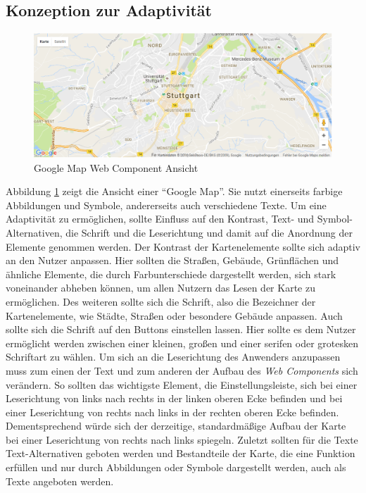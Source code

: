 \documentclass[12pt, paper=a4, bibtotoc, toc=listof, headsepline=true, numbers=endperiod]{scrreprt}
\begin{document}
	\subsection{Konzeption zur Adaptivität}
	\label{ref:konVonAda}
	\begin{figure}			\centering
		\includegraphics[width=\textwidth,height=\textheight,keepaspectratio]{gmap.png}
		\caption[Google Map Web Component]{Google Map Web Component Ansicht}
		\label{img:gmap}
	\end{figure}
	Abbildung \ref{img:gmap} zeigt die Ansicht einer \enquote{Google Map}. Sie nutzt einerseits farbige Abbildungen und Symbole, andererseits auch verschiedene Texte. Um eine Adaptivität zu ermöglichen, sollte Einfluss auf den Kontrast, Text- und Symbol-Alternativen, die Schrift und die Leserichtung und damit auf die Anordnung der Elemente genommen werden. Der Kontrast der Kartenelemente sollte sich adaptiv an den Nutzer anpassen. Hier sollten die Straßen, Gebäude, Grünflächen und ähnliche Elemente, die durch Farbunterschiede dargestellt werden, sich stark voneinander abheben können, um allen Nutzern das Lesen der Karte zu ermöglichen. Des weiteren sollte sich die Schrift, also die Bezeichner der Kartenelemente, wie Städte, Straßen oder besondere Gebäude anpassen. Auch sollte sich die Schrift auf den Buttons einstellen lassen. Hier sollte es dem Nutzer ermöglicht werden zwischen einer kleinen, großen und einer serifen oder grotesken Schriftart zu wählen. Um sich an die Leserichtung des Anwenders anzupassen muss zum einen der Text und zum anderen der Aufbau des \emph{Web Components} sich verändern. So sollten das wichtigste Element, die Einstellungsleiste, sich bei einer Leserichtung von links nach rechts in der linken oberen Ecke befinden und bei einer Leserichtung von rechts nach links in der rechten oberen Ecke befinden. Dementsprechend würde sich der derzeitige, standardmäßige Aufbau der Karte bei einer Leserichtung von rechts nach links spiegeln. Zuletzt sollten für die Texte Text-Alternativen geboten werden und Bestandteile der Karte, die eine Funktion erfüllen und nur durch Abbildungen oder Symbole dargestellt werden, auch als Texte angeboten werden. 
\end{document}
